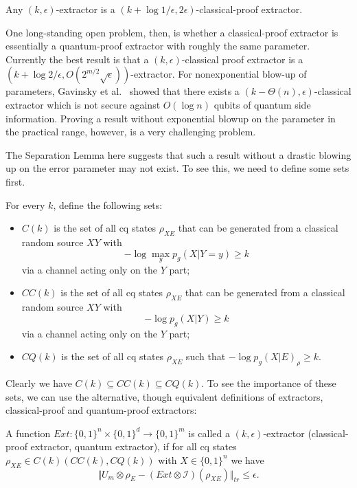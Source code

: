 \begin{theorem}
    \label{thm:cpext}
    Any $(k,\epsilon)$-extractor is a $(k+\log 1/\epsilon, 2\epsilon)$-classical-proof extractor.
\end{theorem}

One long-standing open problem, then, is whether a classical-proof extractor is essentially a quantum-proof extractor with roughly the same parameter. Currently the best result is that a $(k,\epsilon)$-classical proof extractor is a $(k+\log 2/\epsilon, O(2^{m/2}\sqrt{\epsilon}))$-extractor. For nonexponential blow-up of parameters, Gavinsky et al.~\cite{gavinsky2007exponential} showed that there exists a
$(k-\Theta(n),\epsilon)$-classical extractor which is not secure against $O(\log n)$ qubits of quantum side information.  Proving a result without exponential blowup on the parameter in the practical range, however, is a very challenging problem. 

The Separation Lemma here suggests that such a result without a drastic blowing up on the error parameter may not exist. To see this, we need to define some sets first.

\begin{definition}
    For every $k$, define the following sets:
    \begin{itemize}
        \item $C(k)$ is the set of all cq states $\rho_{XE}$ that can be generated from a classical random source $XY$ with $$-\log \max_{y}p_g(X|Y=y)\geq k$$ via a channel acting only on the $Y$ part;
        \item $CC(k)$ is the set of all cq states $\rho_{XE}$ that can be generated from a classical random source $XY$ with $$-\log p_g(X|Y)\geq k$$ via a channel acting only on the $Y$ part;
        \item $CQ(k)$ is the set of all cq states $\rho_{XE}$ such that $-\log p_g(X|E)_\rho\geq k$.
        \end{itemize}
\end{definition}

Clearly we have $C(k)\subseteq CC(k)\subseteq CQ(k)$. To see the importance of these sets, we can use the alternative, though equivalent definitions of extractors, classical-proof and quantum-proof extractors:
\begin{definition}
    A function $Ext:\{0,1\}^n\times \{0,1\}^d\rightarrow\{0,1\}^m$ is called a $(k,\epsilon)$-extractor (classical-proof extractor, quantum extractor), if for all cq states $\rho_{XE}\in C(k) (CC(k), CQ(k))$ with $X\in\{0,1\}^n$ we have
    $$\Vert U_m\otimes\rho_E-(Ext\otimes \mathcal{I})(\rho_{XE})\Vert_{tr}\leq \epsilon.$$
\end{definition}

